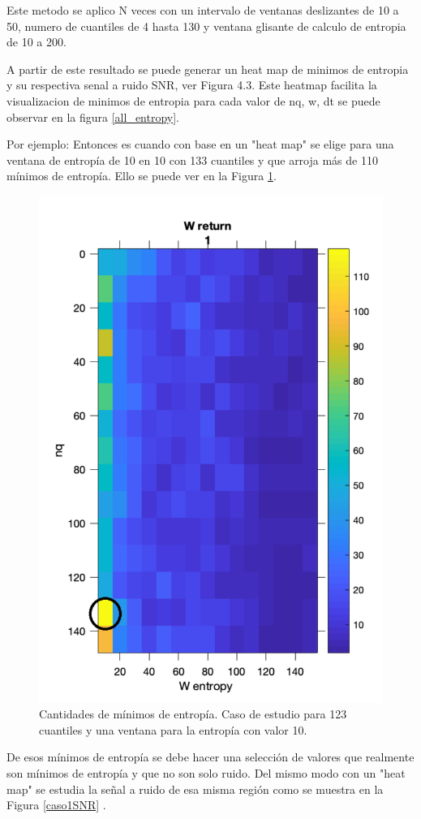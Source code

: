 Este metodo se aplico N veces con un intervalo de ventanas deslizantes de 10 a 50,  numero de cuantiles de 4 hasta 130 y ventana glisante de calculo de entropia de 10 a 200.


A partir de este resultado se puede generar un heat map de minimos de entropia y su respectiva senal a ruido SNR, ver Figura 4.3. 
Este heatmap facilita la visualizacion de minimos de entropia para cada valor de nq, w, dt se puede observar en la figura \ref{all_entropy}.



Por ejemplo: 
Entonces es cuando con base en un "heat map" se elige para una ventana de entropía de 10 en 10 con 133 cuantiles y que arroja más de 110 mínimos de entropía. Ello se puede ver en la Figura \ref{caso1}. 


\begin{figure}[h]
	\centering
	\includegraphics[width=0.7\linewidth]{figures/ejemplo_min_entropy}
	\caption{Cantidades de mínimos de entropía. Caso de estudio para 123 cuantiles y una ventana para la entropía con valor 10.}
	\label{caso1}
\end{figure}

De esos mínimos de entropía se debe hacer una selección de valores que realmente son mínimos de entropía y que no son solo ruido. Del mismo modo con un "heat map" se estudia la señal a ruido de esa misma región como se muestra en la Figura \ref{caso1SNR} .

